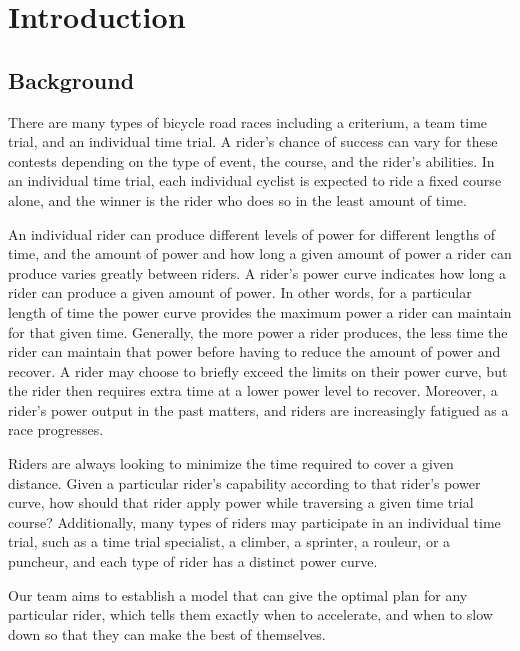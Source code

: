 \documentclass[12pt]{article}
\begin{document}
\clearpage
\pagestyle{fancy}
\tableofcontents
\newpage
\setcounter{page}{1}


\section{Introduction}
\subsection{Background}

There are many types of bicycle road races including a criterium, a team time trial, and an
individual time trial. A rider's chance of success can vary for these contests depending on the
type of event, the course, and the rider's abilities. In an individual time trial, each individual
cyclist is expected to ride a fixed course alone, and the winner is the rider who does so in the
least amount of time.

An individual rider can produce different levels of power for different lengths of time, and the
amount of power and how long a given amount of power a rider can produce varies greatly
between riders. A rider's power curve indicates how long a rider can produce a given amount of
power. In other words, for a particular length of time the power curve provides the maximum
power a rider can maintain for that given time. Generally, the more power a rider produces, the
less time the rider can maintain that power before having to reduce the amount of power and
recover. A rider may choose to briefly exceed the limits on their power curve, but the rider then
requires extra time at a lower power level to recover. Moreover, a rider's power output in the
past matters, and riders are increasingly fatigued as a race progresses.

Riders are always looking to minimize the time required to cover a given distance. Given a
particular rider's capability according to that rider's power curve, how should that rider apply
power while traversing a given time trial course? Additionally, many types of riders may
participate in an individual time trial, such as a time trial specialist, a climber, a sprinter, a
rouleur, or a puncheur, and each type of rider has a distinct power curve.

Our team aims to establish a model that can give the optimal plan for any particular rider, which tells them exactly when to accelerate,
and when to slow down so that they can make the best of themselves.
\end{document}
